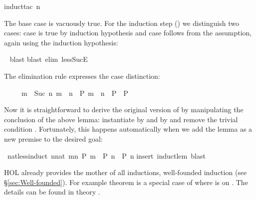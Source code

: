 \begin{isabellebody}
%
\endisadelimproof
%
\isatagproof
{}\isamarkupfalse%
{\isacharparenleft}induct{\isacharunderscore}tac\ n{\isacharparenright}%
\begin{isamarkuptxt}%
\noindent
The base case is vacuously true. For the induction step () we distinguish two cases: case  is true by induction
hypothesis and case  follows from the assumption, again using
the induction hypothesis:%
\end{isamarkuptxt}%
\isamarkuptrue%
\ \isamarkupfalse%
{\isacharparenleft}blast{\isacharparenright}\isanewline
{}\isamarkupfalse%
{\isacharparenleft}blast\ elim{\isacharcolon}\ less{\isacharunderscore}SucE{\isacharparenright}%
\endisatagproof
{\isafoldproof}%
%
\isadelimproof
%
\endisadelimproof
%
\begin{isamarkuptext}%
\noindent
The elimination rule  expresses the case distinction:
\begin{isabelle}%
\ \ \ \ \ {\isasymlbrakk}m\ {\isacharless}\ Suc\ n{\isacharsemicolon}\ m\ {\isacharless}\ n\ {\isasymLongrightarrow}\ P{\isacharsemicolon}\ m\ {\isacharequal}\ n\ {\isasymLongrightarrow}\ P{\isasymrbrakk}\ {\isasymLongrightarrow}\ P%
\end{isabelle}

Now it is straightforward to derive the original version of
 by manipulating the conclusion of the above
lemma: instantiate  by  and  by 
and remove the trivial condition . Fortunately, this
happens automatically when we add the lemma as a new premise to the
desired goal:%
\end{isamarkuptext}%
\isamarkuptrue%
\isamarkupfalse%
\ nat{\isacharunderscore}less{\isacharunderscore}induct{\isacharcolon}\ {\isachardoublequoteopen}{\isacharparenleft}{\isasymAnd}n{\isacharcolon}{\isacharcolon}nat{\isachardot}\ {\isasymforall}m{\isacharless}n{\isachardot}\ P\ m\ {\isasymLongrightarrow}\ P\ n{\isacharparenright}\ {\isasymLongrightarrow}\ P\ n{\isachardoublequoteclose}\isanewline
%
\isadelimproof
%
\endisadelimproof
%
\isatagproof
{}\isamarkupfalse%
{\isacharparenleft}insert\ induct{\isacharunderscore}lem{\isacharcomma}\ blast{\isacharparenright}%
\endisatagproof
{\isafoldproof}%
%
\isadelimproof
%
\endisadelimproof
%
\begin{isamarkuptext}%
HOL already provides the mother of
all inductions, well-founded induction (see \S\ref{sec:Well-founded}).  For
example theorem  is
a special case of  where  is \isa{{\isacharless}} on
. The details can be found in theory .%
\end{isamarkuptext}%
\isamarkuptrue%
%
\isadelimtheory
%
\endisadelimtheory
%
\isatagtheory
%
\endisatagtheory
{\isafoldtheory}%
%
\isadelimtheory
%
\endisadelimtheory
\end{isabellebody}%
